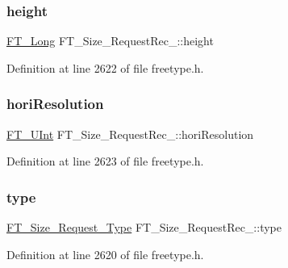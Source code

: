 \subsubsection{\texorpdfstring{height}{height}}
{\footnotesize\ttfamily \mbox{\hyperlink{fttypes_8h_a7fa72a1f0e79fb1860c5965789024d6f}{F\+T\+\_\+\+Long}} F\+T\+\_\+\+Size\+\_\+\+Request\+Rec\+\_\+\+::height}



Definition at line 2622 of file freetype.\+h.

\mbox{\label{struct_f_t___size___request_rec___a3a85704d13561d9db53aa60f7805ec73}} 
\subsubsection{\texorpdfstring{horiResolution}{horiResolution}}
{\footnotesize\ttfamily \mbox{\hyperlink{fttypes_8h_abcb8db4dbf35d2b55a9e8c7b0926dc52}{F\+T\+\_\+\+U\+Int}} F\+T\+\_\+\+Size\+\_\+\+Request\+Rec\+\_\+\+::hori\+Resolution}



Definition at line 2623 of file freetype.\+h.

\mbox{\label{struct_f_t___size___request_rec___a7644b04dd2b26c0698df558775320494}} 
\subsubsection{\texorpdfstring{type}{type}}
{\footnotesize\ttfamily \mbox{\hyperlink{freetype_8h_ac10a6bdce0674edb378e81f8a19b6867}{F\+T\+\_\+\+Size\+\_\+\+Request\+\_\+\+Type}} F\+T\+\_\+\+Size\+\_\+\+Request\+Rec\+\_\+\+::type}



Definition at line 2620 of file freetype.\+h.

\mbox{\label{struct_f_t___size___request_rec___a86601c38d91064b6efe256a9e99c56f4}} 
